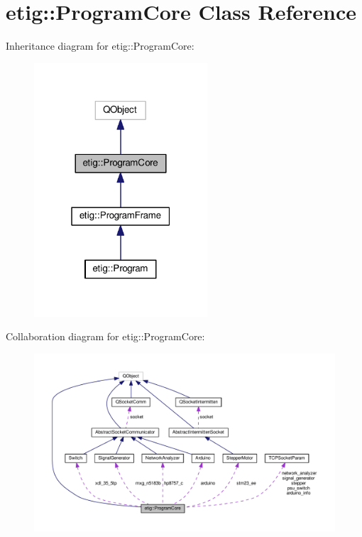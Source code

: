 \hypertarget{classetig_1_1_program_core}{}\section{etig\+:\+:Program\+Core Class Reference}
\label{classetig_1_1_program_core}


Inheritance diagram for etig\+:\+:Program\+Core\+:\nopagebreak
\begin{figure}[H]
\begin{center}
\leavevmode
\includegraphics[width=183pt]{classetig_1_1_program_core__inherit__graph}
\end{center}
\end{figure}


Collaboration diagram for etig\+:\+:Program\+Core\+:\nopagebreak
\begin{figure}[H]
\begin{center}
\leavevmode
\includegraphics[width=350pt]{classetig_1_1_program_core__coll__graph}
\end{center}
\end{figure}
